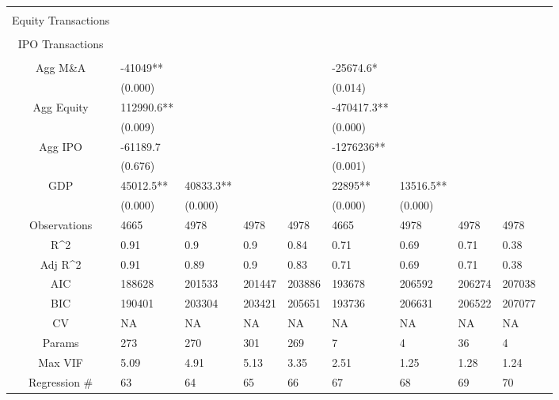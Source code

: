 \documentclass{article}
\begin{document}
\begin{table}[H]
\begin{tabular}{|clllllllll|}
   &  &  &  &  &  &  &  &  & \\ 
  Equity Transactions &  &  &  &  &  &  &  &  & \\ 
   &  &  &  &  &  &  &  &  & \\ 
  IPO Transactions &  &  &  &  &  &  &  &  & \\ 
   &  &  &  &  &  &  &  &  & \\ 
  Agg M\&A & -41049** &  &  &  & -25674.6* &  &  &  & \\ 
   & (0.000) &  &  &  & (0.014) &  &  &  & \\ 
  Agg Equity & 112990.6** &  &  &  & -470417.3** &  &  &  & \\ 
   & (0.009) &  &  &  & (0.000) &  &  &  & \\ 
  Agg IPO & -61189.7 &  &  &  & -1276236** &  &  &  & \\ 
   & (0.676) &  &  &  & (0.001) &  &  &  & \\ 
  GDP & 45012.5** & 40833.3** &  &  & 22895** & 13516.5** &  &  & \\ 
   & (0.000) & (0.000) &  &  & (0.000) & (0.000) &  &  & \\ 
  \hline 
 Observations & 4665 & 4978 & 4978 & 4978 & 4665 & 4978 & 4978 & 4978 & \\ 
  R^2 & 0.91 & 0.9 & 0.9 & 0.84 & 0.71 & 0.69 & 0.71 & 0.38 & \\ 
  Adj R^2 & 0.91 & 0.89 & 0.9 & 0.83 & 0.71 & 0.69 & 0.71 & 0.38 & \\ 
  AIC & 188628 & 201533 & 201447 & 203886 & 193678 & 206592 & 206274 & 207038 & \\ 
  BIC & 190401 & 203304 & 203421 & 205651 & 193736 & 206631 & 206522 & 207077 & \\ 
  CV & NA & NA & NA & NA & NA & NA & NA & NA & \\ 
  Params & 273 & 270 & 301 & 269 & 7 & 4 & 36 & 4 & \\ 
  Max VIF & 5.09 & 4.91 & 5.13 & 3.35 & 2.51 & 1.25 & 1.28 & 1.24 & \\ 
  Regression \# & 63 & 64 & 65 & 66 & 67 & 68 & 69 & 70 & \\ 
   \hline
\end{tabular}
 
\end{table}
\end{document}
